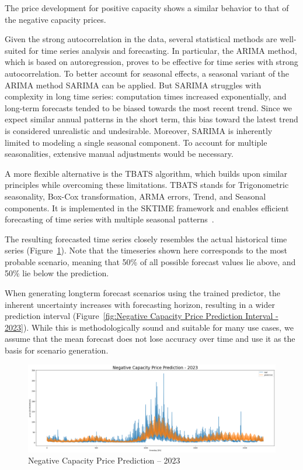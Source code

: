 The price development for positive capacity shows a similar behavior
to that of the negative capacity prices.

Given the strong autocorrelation in the data, several statistical methods are well-suited
for time series analysis and forecasting. In particular, the ARIMA method,
which is based on autoregression, proves to be effective for time series
with strong autocorrelation. To better account for seasonal effects,
a seasonal variant of the ARIMA method SARIMA can be applied.
But SARIMA struggles with complexity in long time series:
computation times increased exponentially, and long-term forecasts tended to be biased
towards the most recent trend.
Since we expect similar annual patterns in the short term, this bias toward the latest trend
is considered unrealistic and undesirable.
Moreover, SARIMA is inherently limited to modeling a single seasonal component.
To account for multiple seasonalities, extensive manual adjustments would be necessary.

A more flexible alternative is the TBATS algorithm, which builds upon similar principles
while overcoming these limitations. TBATS stands for Trigonometric seasonality,
Box-Cox transformation, ARMA errors, Trend, and Seasonal components.
It is implemented in the SKTIME framework and enables efficient forecasting
of time series with multiple seasonal patterns~\cite{.05.04.2025}.

The resulting forecasted time series closely resembles the actual historical time series
(Figure~\ref{fig:Negative Capacity Price Prediction - 2023}).
Note that the timeseries shown here corresponds to the most probable scenario,
meaning that 50\% of all possible forecast values lie above, and 50\% lie below the prediction.

When generating longterm forecast scenarios using the trained predictor,
the inherent uncertainty increases with forecasting horizon,
resulting in a wider prediction interval
(Figure~\ref{fig:Negative Capacity Price Prediction Interval - 2023}).
While this is methodologically sound and suitable for many use cases,
we assume that the mean forecast does not lose accuracy over time
and use it as the basis for scenario generation.

\begin{figure}[!h]
	\centering
	\includegraphics[width=1\linewidth]{pictures/RL/Negative Capacity Price Prediction - 2023.png}
	\caption{Negative Capacity Price Prediction – 2023}
	\label{fig:Negative Capacity Price Prediction - 2023}
\end{figure}

